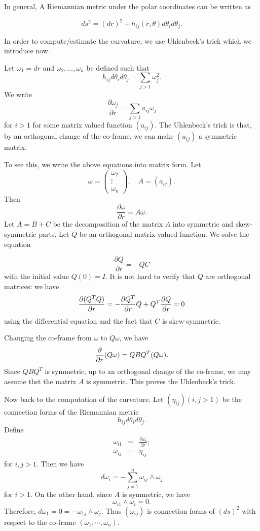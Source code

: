In general, A Riemannian metric under the polar coordinates can be written as 
 
%
\[ ds^2 = (dr)^2 + h _{ij} (r, \theta) d \theta _i d \theta_j .\]

In order to compute/estimate the curvature, we use  Uhlenbeck's trick which we introduce now.


Let $ \omega _1 = dr$ and $ \omega _2 , \ldots, \omega_n $ be defined such that 
%
\[ h_{ij} d \theta_i d \theta_j = \sum_{j > 1} \omega ^2 _j .\]
%
We write 
\[ \frac{\partial \omega _j}{\partial r} =\sum_{j>1} a_{ij} \omega _j \]
for $i>1$
%
for some matrix valued function $(a_{ij})$. The Uhlenbeck's trick is  that, by an orthogonal change of the co-frame, we can make $(a_{ij})$ a  symmetric matrix.

To see this, we write the above equations into matrix form. Let 
%
\[ \omega = \left( \begin{array}{c} \omega_2 \\
\vdots\\
\omega_n\end{array}\right),\quad   A = (a_{ij}) .\]
%
Then 
\[ \frac{\partial \omega}{\partial r } = A \omega .\]
%
Let $ A = B+C $ be the decomposition of the matrix $A$ into symmetric and skew-symmetric parts.
Let $ Q$ be an orthogonal matrix-valued function. 
We solve the equation

\[ \frac{\partial Q}{\partial r}    = - QC\]
with the initial value $Q(0)=I$. It is not hard to verify that $Q$ are orthogonal matrices: we have
\[ \frac{\partial (Q^TQ)}{\partial r}  = -\frac{\partial Q^T}{\partial r}Q+Q^T\frac{\partial Q}{\partial r}=0\]
using the differential equation and the fact that $C$ is skew-symmetric.

Changing the co-frame from $\omega$ to $Q\omega$, we have
\[
\frac{\partial}{\partial r}(Q\omega)=QBQ^T(Q\omega).
\]
Since $QBQ^T$ is symmetric, up to an orthogonal change of the co-frame, we may assume thst the matrix $A$ is symmetric. This proves the Uhlenbeck's trick.

Now back to the computation of the curvature. Let $(\eta _{ij} )( i , j > 1)$ be the connection forms of the Riemannian metric 
\[ h_{ij} d \theta _i d \theta _j. \]
%
Define 
\begin{eqnarray*}
\omega_{i1} & = & \frac{\partial \omega_i}{\partial r};\\
\omega _{ij } & = & 
\eta_{ij} \end{eqnarray*} 
for $i,j>1$.
Then we have 
\[ d \omega _i = - \sum_{j=1}^n\omega_{ij} \wedge \omega_j\]
for $ i > 1 $.  On the other hand, since $A$ is symmetric, we have
\[
\omega_{i1}\wedge\omega_i=0.
\]
Therefore, $d\omega_1=0=-\omega_{1j}\wedge\omega_j$.
Thus $(\omega_{ij})$ is connection forms of $(ds)^2$ with respect to the co-frame $(\omega_1,\cdots,\omega_n)$. 

